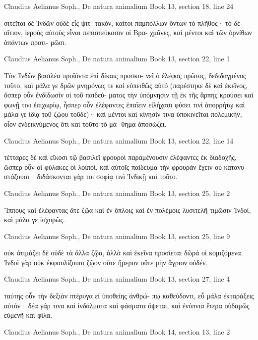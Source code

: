 \documentclass[12pt,letterpaper,twoside,final]{memoir}
\begin{document}
\begin{greek}
Claudius Aelianus Soph., De natura animalium 
Book 13, section 18, line 24

                     σιτεῖται δὲ Ἰνδῶν οὐδὲ εἷς ψιτ-
τακόν, καίτοι παμπόλλων ὄντων τὸ πλῆθος· τὸ δὲ 
αἴτιον, ἱεροὺς αὐτοὺς εἶναι πεπιστεύκασιν οἱ Βρα-
χμᾶνες, καὶ μέντοι καὶ τῶν ὀρνίθων ἁπάντων προτι-
μῶσι. 



Claudius Aelianus Soph., De natura animalium 
Book 13, section 22, line 1

Τὸν Ἰνδῶν βασιλέα προϊόντα ἐπὶ δίκαις προσκυ-
νεῖ ὁ ἐλέφας πρῶτος, δεδιδαγμένος τοῦτο, καὶ μάλα 
γε δρῶν μνημόνως τε καὶ εὐπειθῶς αὐτό (παρέστηκε 
δὲ καὶ ἐκεῖνος, ὅσπερ οὖν ἐνδίδωσίν οἱ τοῦ παιδεύ-
ματος τὴν ὑπόμνησιν τῇ ἐκ τῆς ἅρπης κρούσει καὶ 
φωνῇ τινι ἐπιχωρίῳ, ἧσπερ οὖν ἐλέφαντες ἐπαΐειν 
εἰλήχασι φύσει τινὶ ἀπορρήτῳ καὶ μάλα γε ἰδίᾳ τοῦ 
ζῴου τοῦδε)· καὶ μέντοι καὶ κίνησίν τινα ὑποκινεῖται 
πολεμικήν, οἷον ἐνδεικνύμενος ὅτι καὶ τοῦτο τὸ μά-
θημα ἀποσώζει. 



Claudius Aelianus Soph., De natura animalium 
Book 13, section 22, line 14

                 τέτταρες δὲ καὶ εἴκοσι τῷ βασιλεῖ 
φρουροὶ παραμένουσιν ἐλέφαντες ἐκ διαδοχῆς, ὥσπερ 
οὖν οἱ φύλακες οἱ λοιποί, καὶ αὐτοῖς παίδευμα τὴν 
φρουρὰν ἔχειν οὐ κατανυστάζουσι· διδάσκονται γάρ 
τοι σοφίᾳ τινὶ Ἰνδικῇ καὶ τοῦτο. 



Claudius Aelianus Soph., De natura animalium 
Book 13, section 25, line 2

Ἵππους καὶ ἐλέφαντας ἅτε ζῷα καὶ ἐν ὅπλοις καὶ 
ἐν πολέμοις λυσιτελῆ τιμῶσιν Ἰνδοί, καὶ μάλα γε 
ἰσχυρῶς. 



Claudius Aelianus Soph., De natura animalium 
Book 13, section 25, line 9

      οὐκ ἀτιμάζει δὲ οὐδὲ τὰ ἄλλα ζῷα, ἀλλὰ καὶ   
ἐκεῖνα προσίεται δῶρά οἱ κομιζόμενα. Ἰνδοὶ γὰρ 
οὐκ ἐκφαυλίζουσι ζῷον οὔτε ἥμερον οὔτε μὴν ἄγριον 
οὐδέν. 



Claudius Aelianus Soph., De natura animalium 
Book 13, section 27, line 4

ταύτης οὖν τὴν δεξιὰν πτέρυγα εἰ ὑποθείης ἀνθρώ-
πῳ καθεύδοντι, εὖ μάλα ἐκταράξεις αὐτόν· δέα γάρ 
τινα καὶ ἰνδάλματα καὶ φάσματα ὄψεται, καὶ ἐνύπνια 
ἕτερα οὐδαμῶς εὐμενῆ καὶ φίλα. 



Claudius Aelianus Soph., De natura animalium 
Book 14, section 13, line 2


\end{greek}
\end{document}
